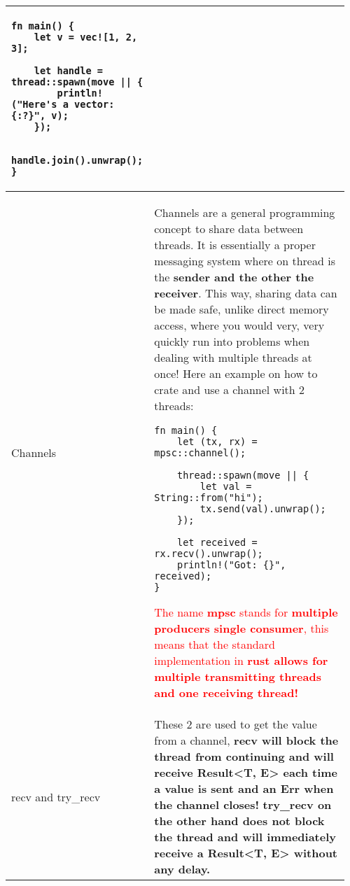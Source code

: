 \documentclass[main.tex,fontsize=8pt,paper=a4,paper=portrait,DIV=calc,]{scrartcl}
\begin{document}
\begin{table}[ht!]
\begin{tabular}{|m{0.2\linewidth}|m{0.755\linewidth}|}
\begin{lstlisting}
fn main() {
    let v = vec![1, 2, 3];

    let handle = thread::spawn(move || {
        println!("Here's a vector: {:?}", v);
    });

    handle.join().unwrap();
}
\end{lstlisting}\\
\hline
Channels & 
Channels are a general programming concept to share data between threads. It is essentially a proper messaging system where on thread is the \textbf{sender and the other the receiver}.\newline
This way, sharing data can be made safe, unlike direct memory access, where you would very, very quickly run into problems when dealing with multiple threads at once!\newline
Here an example on how to crate and use a channel with 2 threads:\newline
\begin{lstlisting}
fn main() {
    let (tx, rx) = mpsc::channel();

    thread::spawn(move || {
        let val = String::from("hi");
        tx.send(val).unwrap();
    });

    let received = rx.recv().unwrap();
    println!("Got: {}", received);
}
\end{lstlisting}
\textcolor{red}{The name \textbf{mpsc} stands for \textbf{multiple producers single consumer}, this means that the standard implementation in \textbf{rust allows for multiple transmitting threads and one receiving thread!}}\\
\hline
recv and try\_recv &
These 2 are used to get the value from a channel, \textbf{recv will block the thread from continuing and will receive Result<T, E> each time a value is sent and an Err when the channel closes!}\newline
\textbf{try\_recv on the other hand does not block the thread and will immediately receive a Result<T, E> without any delay.}\\
\hline
\end{tabular}
\end{table}
\pagebreak
\end{document}
